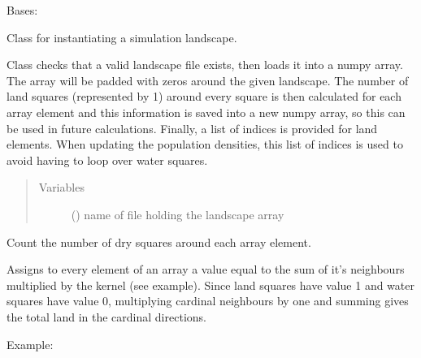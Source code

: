 \documentclass[letterpaper,10pt,english]{sphinxmanual}
\begin{document}
\begin{fulllineitems}
\label{\detokenize{pumha:pumha.env.Landscape}}
Bases: 

Class for instantiating a simulation landscape.

Class checks that a valid landscape file exists, then loads it into a
numpy array. The array will be padded with zeros around the
given landscape. The number of land squares (represented by 1) around
every square is then calculated for each array element and this
information is saved into a new numpy array, so this can be used in future
calculations.
Finally, a list of indices is provided for land elements. When updating
the population densities, this list of indices is used to avoid having to
loop over water squares.
\begin{quote}\begin{description}
\item[{Variables}] \leavevmode
{} () \textendash{} name of file holding the landscape array

\end{description}\end{quote}

\begin{fulllineitems}
\label{\detokenize{pumha:pumha.env.Landscape.find_dry_squares}}
Count the number of dry squares around each array element.

Assigns to every element of an array a value equal to the sum of it’s
neighbours multiplied by the kernel (see example). Since land squares
have value 1 and water squares have value 0,  multiplying cardinal
neighbours by one and summing gives the total land in the cardinal
directions.

Example:

\begin{sphinxVerbatim}[commandchars=\\\{\}]
               
                           
                           
\end{sphinxVerbatim}


\end{fulllineitems}
\end{fulllineitems}
\end{document}
